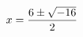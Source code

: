 \documentclass[preview]{standalone}
\begin{document}
\begin{align*}
\special{dvisvgm:raw <g id='unique000'>}x=\frac{6\pm\sqrt{-16}}{2}\special{dvisvgm:raw </g>}
\end{align*}
\end{document}
